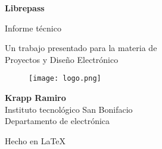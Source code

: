 \documentclass[../informe_krapp.tex]{subfiles}
\begin{document}
\begin{titlepage}
	\begin{center}
		\vspace{1cm}

		{\Huge
			\textbf{Librepass}}

		\vspace{0.3cm}
		{\LARGE
			Informe técnico}

		\vspace{0.5cm}
		{\Large
			Un trabajo presentado para la materia de \\
			Proyectos y Diseño Electrónico}

		\vspace{2cm}

		\begin{figure}[H]
			\centering
			\texttt{[image: logo.png]}
		\end{figure}

		\vfill

		{\LARGE
			\textbf{Krapp Ramiro} \\
			\vspace{0.5cm}
			Instituto tecnológico San Bonifacio\\
			Departamento de electrónica\\
		}

		\vspace{0.5cm}
		{\large Hecho en {\LaTeX}}

	\end{center}
\end{titlepage}
\end{document}
